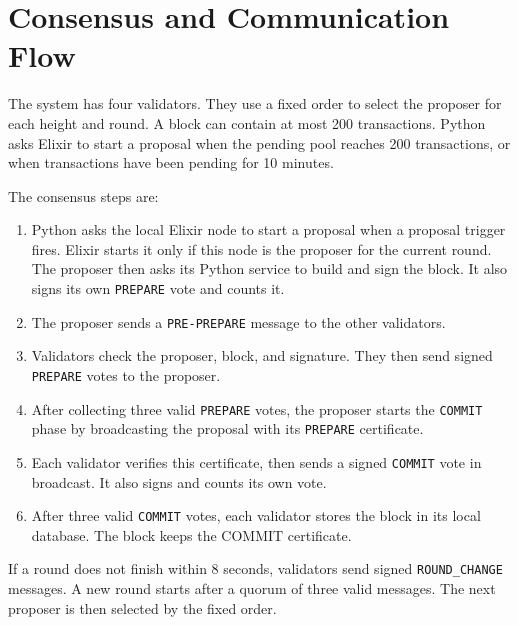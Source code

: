 \documentclass[11pt, a4paper, oneside]{memoir}
\begin{document}
\section{Consensus and Communication Flow}
The system has four validators. They use a fixed order to select the proposer
for each height and round. A block can contain at most 200 transactions.
Python asks Elixir to start a proposal when the pending pool reaches 200
transactions, or when transactions have been pending for 10 minutes.

The consensus steps are:
\begin{enumerate}
    \item Python asks the local Elixir node to start a proposal when a proposal
    trigger fires. Elixir starts it only if this node is the proposer for the
    current round. The proposer then asks its Python service to build and sign
    the block. It also signs its own \texttt{PREPARE} vote and counts it.
    \item The proposer sends a \texttt{PRE-PREPARE} message to the other validators.
    \item Validators check the proposer, block, and signature. They then send
    signed \texttt{PREPARE} votes to the proposer.
    \item After collecting three valid \texttt{PREPARE} votes, the proposer
    starts the \texttt{COMMIT} phase by broadcasting the proposal with its
    \texttt{PREPARE} certificate.
    \item Each validator verifies this certificate, then sends a signed
    \texttt{COMMIT} vote in broadcast. It also signs and counts its own vote.
    \item After three valid \texttt{COMMIT} votes, each validator stores the block in its local database. The block keeps the COMMIT certificate.
\end{enumerate}
If a round does not finish within 8 seconds, validators send signed
\texttt{ROUND\_CHANGE} messages. A new round starts after a quorum of three
valid messages. The next proposer is then selected by the fixed order.
\end{document}
